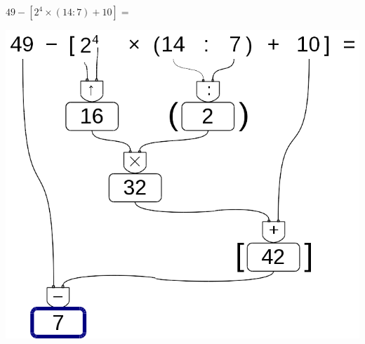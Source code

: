  \begin{esempio}
  \(49 - [2^4 \times (14 : 7) + 10]=\)
  
\begin{inaccessibleblock}
 \begin{center}
  \includegraphics[scale=0.35]{img/op_espr.png}
 \end{center}
\end{inaccessibleblock}
 \end{esempio}

